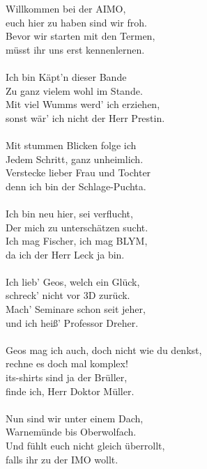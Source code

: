 \documentclass[oneside]{memoir}
\begin{document}
\begin{singlespace}
Willkommen bei der AIMO, \\
euch hier zu haben sind wir froh. \\
Bevor wir starten mit den Termen, \\
müsst ihr uns erst kennenlernen. \\  \\

Ich bin Käpt'n dieser Bande \\
Zu ganz vielem wohl im Stande. \\
Mit viel Wumms werd' ich erziehen, \\
sonst wär' ich nicht der Herr Prestin. \\ \\

Mit stummen Blicken folge ich \\
Jedem Schritt, ganz unheimlich. \\
Verstecke lieber Frau und Tochter \\
denn ich bin der Schlage-Puchta. \\ \\

Ich bin neu hier, sei verflucht, \\
Der mich zu unterschätzen sucht. \\
Ich mag Fischer, ich mag BLYM, \\
 da ich der Herr Leck ja bin. \\ \\

Ich lieb' Geos, welch ein Glück, \\
schreck' nicht vor 3D zurück. \\
Mach' Seminare schon seit jeher, \\
und ich heiß' Professor Dreher. \\ \\

Geos mag ich auch, doch nicht wie du denkst, \\
rechne es doch mal komplex! \\
its-shirts sind ja der Brüller, \\
finde ich, Herr Doktor Müller. \\ \\

Nun sind wir unter einem Dach, \\
Warnemünde bis Oberwolfach. \\
Und fühlt euch nicht gleich überrollt, \\
falls ihr zu der IMO wollt.
\end{singlespace}
\end{document}
